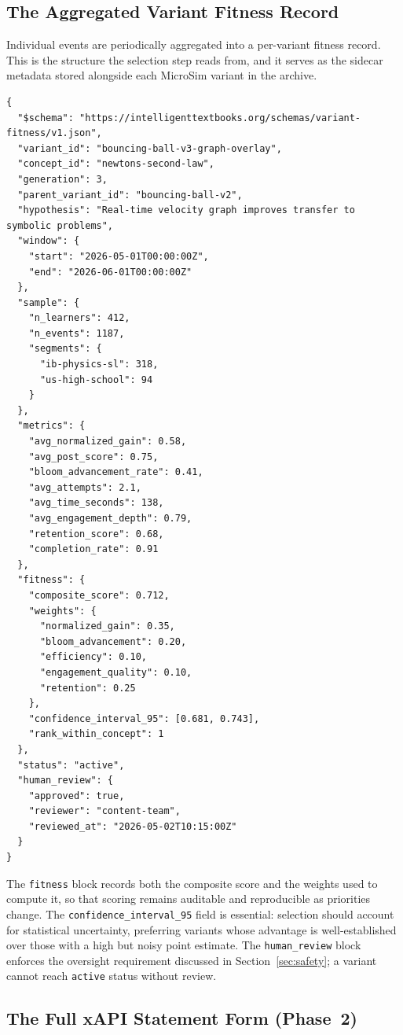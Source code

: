 \subsection{The Aggregated Variant Fitness Record}

Individual events are periodically aggregated into a per-variant fitness
record. This is the structure the selection step reads from, and it serves as
the sidecar metadata stored alongside each MicroSim variant in the archive.

\begin{lstlisting}[style=json]
{
  "$schema": "https://intelligenttextbooks.org/schemas/variant-fitness/v1.json",
  "variant_id": "bouncing-ball-v3-graph-overlay",
  "concept_id": "newtons-second-law",
  "generation": 3,
  "parent_variant_id": "bouncing-ball-v2",
  "hypothesis": "Real-time velocity graph improves transfer to symbolic problems",
  "window": {
    "start": "2026-05-01T00:00:00Z",
    "end": "2026-06-01T00:00:00Z"
  },
  "sample": {
    "n_learners": 412,
    "n_events": 1187,
    "segments": {
      "ib-physics-sl": 318,
      "us-high-school": 94
    }
  },
  "metrics": {
    "avg_normalized_gain": 0.58,
    "avg_post_score": 0.75,
    "bloom_advancement_rate": 0.41,
    "avg_attempts": 2.1,
    "avg_time_seconds": 138,
    "avg_engagement_depth": 0.79,
    "retention_score": 0.68,
    "completion_rate": 0.91
  },
  "fitness": {
    "composite_score": 0.712,
    "weights": {
      "normalized_gain": 0.35,
      "bloom_advancement": 0.20,
      "efficiency": 0.10,
      "engagement_quality": 0.10,
      "retention": 0.25
    },
    "confidence_interval_95": [0.681, 0.743],
    "rank_within_concept": 1
  },
  "status": "active",
  "human_review": {
    "approved": true,
    "reviewer": "content-team",
    "reviewed_at": "2026-05-02T10:15:00Z"
  }
}
\end{lstlisting}

The \texttt{fitness} block records both the composite score and the weights
used to compute it, so that scoring remains auditable and reproducible as
priorities change. The \texttt{confidence\_interval\_95} field is essential:
selection should account for statistical uncertainty, preferring variants whose
advantage is well-established over those with a high but noisy point estimate.
The \texttt{human\_review} block enforces the oversight requirement discussed
in Section~\ref{sec:safety}; a variant cannot reach \texttt{active} status
without review.

\subsection{The Full xAPI Statement Form (Phase~2)}

